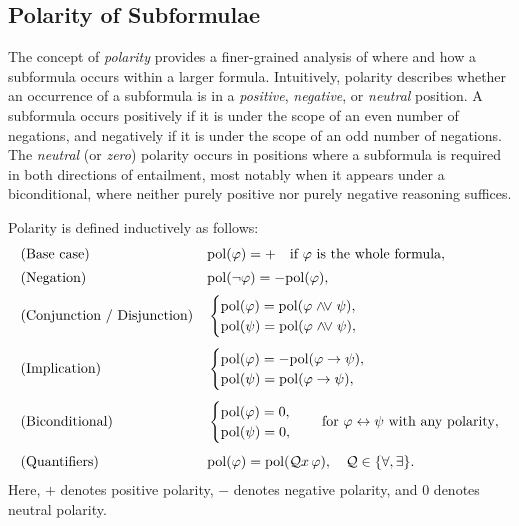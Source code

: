 \subsection{Polarity of Subformulae}\label{subsec:polarity-of-subformulae}

The concept of \emph{polarity} provides a finer-grained analysis of where and how a subformula occurs within a larger formula.
Intuitively, polarity describes whether an occurrence of a subformula is in a \emph{positive}, \emph{negative}, or \emph{neutral} position.
A subformula occurs positively if it is under the scope of an even number of negations, and negatively if it is under the scope of an odd number of negations.
The \emph{neutral} (or \emph{zero}) polarity occurs in positions where a subformula is required in both directions of entailment, most notably when it appears under a biconditional, where neither purely positive nor purely negative reasoning suffices.

Polarity is defined inductively as follows:
\[
\begin{aligned}
&\text{(Base case)} && \mathrm{pol}(\varphi) = + \quad \text{if } \varphi \text{ is the whole formula}, \\[2pt]
&\text{(Negation)} && \mathrm{pol}(\neg \varphi) = -\mathrm{pol}(\varphi), \\[2pt]
&\text{(Conjunction / Disjunction)} && 
\begin{cases}
\mathrm{pol}(\varphi) = \mathrm{pol}(\varphi \mathrel{\land\mkern-3mu\lor} \psi), \\
\mathrm{pol}(\psi) = \mathrm{pol}(\varphi \mathrel{\land\mkern-3mu\lor} \psi),
\end{cases} \\[4pt]
&\text{(Implication)} && 
\begin{cases}
\mathrm{pol}(\varphi) = -\mathrm{pol}(\varphi \rightarrow \psi), \\
\mathrm{pol}(\psi) = \mathrm{pol}(\varphi \rightarrow \psi),
\end{cases} \\[4pt]
&\text{(Biconditional)} && 
\begin{cases}
\mathrm{pol}(\varphi) = 0, \\
\mathrm{pol}(\psi) = 0,
\end{cases} \quad \text{for } \varphi \leftrightarrow \psi \text{ with any polarity}, \\[4pt]
&\text{(Quantifiers)} && \mathrm{pol}(\varphi) = \mathrm{pol}(\mathcal{Q} x\, \varphi), \quad \mathcal{Q} \in \{\forall, \exists\}.
\end{aligned}
\]
Here, \(+\) denotes positive polarity, \(-\) denotes negative polarity, and \(0\) denotes neutral polarity.



